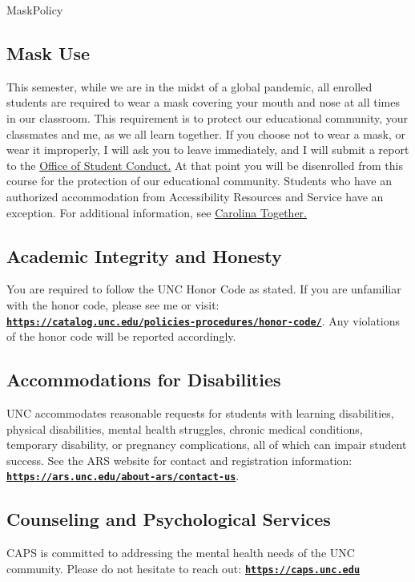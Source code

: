 \documentclass[11pt]{article}
\begin{document}
\begin{ToggleSect}{MaskPolicy}
\subsection*{Mask Use}
This semester, while we are in the midst of a global pandemic, all enrolled students are required to wear a mask covering your mouth and nose at all times in our classroom. This requirement is to protect our educational community, your classmates and me, as we all learn together. If you choose not to wear a mask, or wear it improperly, I will ask you to leave immediately, and I will submit a report to the \href{https://cm.maxient.com/reportingform.php?UNCChapelHill&layout_id=23}{Office of Student Conduct.}  At that point you will be disenrolled from this course for the protection of our educational community. Students who have an authorized accommodation from Accessibility Resources and Service have an exception.  For additional information, see \href{https://carolinatogether.unc.edu/}{Carolina Together.}
\end{ToggleSect}

\subsection*{Academic Integrity and Honesty}
You are required to follow the UNC Honor Code as stated. If you are unfamiliar with the honor code, please see me or visit: \href{https://catalog.unc.edu/policies-procedures/honor-code/}{\tt\bf https://catalog.unc.edu/policies-procedures/honor-code/}. Any violations of the honor code will be reported accordingly.

\subsection*{Accommodations for Disabilities}
UNC accommodates reasonable requests for students with learning disabilities, physical disabilities, mental health struggles, chronic medical conditions, temporary disability, or pregnancy complications, all of which can impair student success. See the ARS website for contact and registration information: \href{https://ars.unc.edu/about-ars/contact-us}{\tt\bf https://ars.unc.edu/about-ars/contact-us}. 

\subsection*{Counseling and Psychological Services}
CAPS is committed to addressing the mental health needs of the UNC community. Please do not hesitate to reach out: \href{https://caps.unc.edu}{\tt\bf https://caps.unc.edu}
\end{document}
